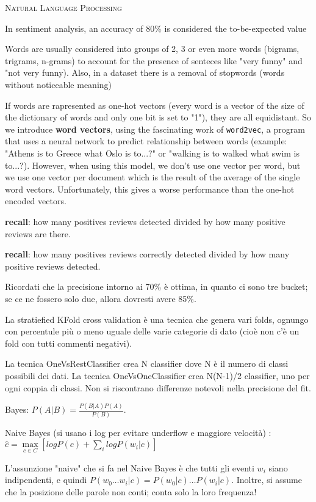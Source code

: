 \documentclass[a4paper,10pt]{article} %
\newcommand{\msection}[1]{%
    {\newpage\bigbreak \bigbreak \par \hfil \huge \textsc {#1}}\par}
\renewcommand{\b}[1]{%
    {\textbf{#1}}}
\renewcommand{\t}[1]{%
    {\texttt{#1}}}
\begin{document}
\msection{Natural Language Processing}
\bigbreak

In sentiment analysis, an accuracy of 80\% is considered the to-be-expected value

Words are usually considered into groups of 2, 3 or even more words (bigrams, trigrams, n-grams) to account for the presence of senteces like "very funny" and "not very funny).  Also, in a dataset there is a removal of stopwords (words without noticeable meaning)

If words are rapresented as one-hot vectors (every word is a vector of the size of the dictionary of words and only one bit is set to "1"), they are all equidistant. So we introduce \b{word vectors}, using the fascinating work of \t{word2vec}, a program that uses a neural network to predict relationship between words (example: "Athens is to Greece what Oslo is to...?" or "walking is to walked what swim is to...?). However, when using this model, we don't use one vector per word, but we use one vector per document which is the result of the average of the single word vectors. Unfortunately, this gives a worse performance than the one-hot encoded vectors.

\b{recall}: how many positives reviews detected divided by how many positive reviews are there.

\b{recall}: how many positives reviews correctly detected divided by how many positive reviews detected.

Ricordati che la precisione intorno ai 70\% è ottima, in quanto ci sono tre bucket; se ce ne fossero solo due, allora dovresti avere 85\%.

La stratiefied KFold cross validation è una tecnica che genera vari folds, ognungo con percentule più o meno uguale delle varie categorie di dato (cioè non c'è un fold con tutti commenti negativi).

La tecnica OneVsRestClassifier crea N classifier dove N è il numero di classi possibili dei dati. La tecnica OneVsOneClassifier crea N(N-1)/2 classifier, uno per ogni coppia di classi. Non si riscontrano differenze notevoli nella precisione del fit.

Bayes: $P(A|B) = \frac{P(B|A)P(A)}{P(B)}$.

Naive Bayes (si usano i log per evitare underflow e maggiore velocità) : $\hat{c} = \max\limits_{c \in C} \left[ log P(c) + \sum\limits_{i} log P(w_i | c) \right]$

L'assunzione "naive" che si fa nel Naive Bayes è che tutti gli eventi $w_i$ siano indipendenti, e quindi $P(w_0 \ldots w_i | c) = P(w_0|c) \ldots P(w_i|c)$. Inoltre, si assume che la posizione delle parole non conti; conta solo la loro frequenza!
\end{document}
